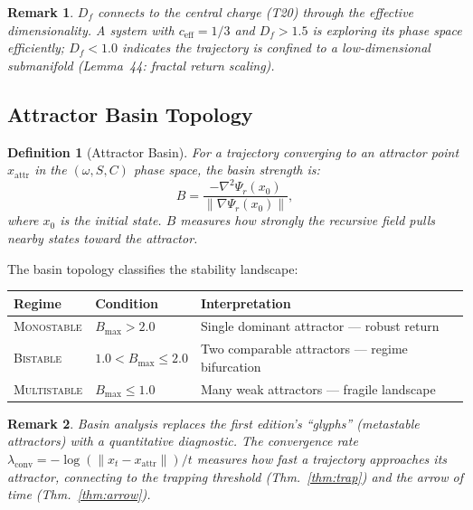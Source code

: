 \documentclass[
  aps,
  prd,
  preprint,
  superscriptaddress,
  nofootinbib,
  floatfix,
  longbibliography
]{revtex4-2}
\newtheorem{definition}[theorem]{Definition}
\newtheorem{remark}{Remark}
\newcommand{\beq}{\begin{equation}}
\newcommand{\eeq}{\end{equation}}
\newcommand{\regime}[1]{\textnormal{\textsc{#1}}}
\newcommand{\Drft}{\omega}
\newcommand{\Ent}{S}
\newcommand{\Curv}{C}
\newcommand{\ceff}{c_{\mathrm{eff}}}
\newcommand{\Psirec}{\Psi_{r}}
\begin{document}
\begin{remark}
$D_f$ connects to the central charge (T20) through
the effective dimensionality.
A system with $\ceff = 1/3$ and $D_f > 1.5$ is
exploring its phase space efficiently; $D_f < 1.0$
indicates the trajectory is confined to a low-dimensional
submanifold (Lemma~44: fractal return scaling).
\end{remark}

\subsection{Attractor Basin Topology}

\begin{definition}[Attractor Basin]\label{def:basin}
For a trajectory converging to an attractor point
$x_{\mathrm{attr}}$ in the $(\Drft, \Ent, \Curv)$ phase
space, the basin strength is:
\beq
  B = \frac{-\nabla^2 \Psirec(x_0)}
           {\|\nabla \Psirec(x_0)\|},
\eeq
where $x_0$ is the initial state.
$B$ measures how strongly the recursive field pulls
nearby states toward the attractor.
\end{definition}

The basin topology classifies the stability landscape:

\begin{center}
\begin{tabular}{@{}lll@{}}
\toprule
\textbf{Regime} & \textbf{Condition} & \textbf{Interpretation} \\
\midrule
\regime{Monostable}  & $B_{\max} > 2.0$ &
  Single dominant attractor — robust return \\
\regime{Bistable}    & $1.0 < B_{\max} \leq 2.0$ &
  Two comparable attractors — regime bifurcation \\
\regime{Multistable} & $B_{\max} \leq 1.0$ &
  Many weak attractors — fragile landscape \\
\bottomrule
\end{tabular}
\end{center}

\begin{remark}
Basin analysis replaces the first edition's ``glyphs''
(metastable attractors) with a quantitative diagnostic.
The convergence rate
$\lambda_{\mathrm{conv}} = -\log(\|x_t - x_{\mathrm{attr}}\|) / t$
measures how fast a trajectory approaches its attractor,
connecting to the trapping threshold
(Thm.~\ref{thm:trap}) and the arrow of time
(Thm.~\ref{thm:arrow}).
\end{remark}
\end{document}
